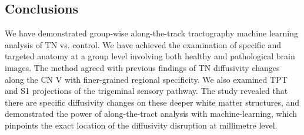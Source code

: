 \subsection{Conclusions}
We have demonstrated group-wise along-the-track tractography machine learning analysis of TN vs. control. We have achieved the examination of specific and targeted anatomy at a group level involving both healthy and pathological brain images. The method agreed with previous findings of TN diffusivity changes along the CN V with finer-grained regional specificity. We also examined TPT and S1 projections of the trigeminal sensory pathway. The study revealed that there are specific diffusivity changes on these deeper white matter structures, and demonstrated the power of along-the-tract analysis with machine-learning, which pinpoints the exact location of the diffusivity disruption at millimetre level. 
